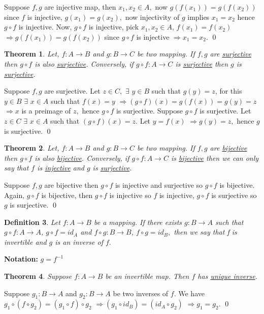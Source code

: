 \documentclass[11pt]{amsart}
\newtheorem{theorem}{Theorem}[section]
\newtheorem{definition}[theorem]{Definition}%
\begin{document}
\proof Suppose $f,g$ are injective map, then $x_{1},x_{2} \in A,$ now $g(f(x_{1}))=g(f(x_{2}))$ since $f$ is injective, $g(x_{1})=g(x_{2}),$ now injectivity of $g$ implies $x_{1}=x_{2}$ hence $g \circ f$ is injective. Now, $g\circ f$ is injective, pick $x_{1}, x_{2} \in A$, $f(x_{1})=f(x_{2})$ $\Rightarrow g(f(x_{1}))=g(f(x_{2}))$ since $g\circ f$ is injective $\Rightarrow x_{1}=x_{2}.$ \qed
\begin{theorem}
Let,  $f: A \rightarrow B$ and $g: B \rightarrow C$ be two mapping. If $f,g$ are \underline{surjective} then $g \circ f$ is also \underline{surjective}. Conversely, if $g\circ f:A \rightarrow C$ is \underline{surjective} then $g$ is \underline{surjective}.
\end{theorem}
\proof Suppose $f,g$ are surjective. Let $z \in C,$ $\exists$ $ y \in B$ such that $g(y)=z$, for this $y\in B$ $\exists$ $ x \in A$ such that $f(x)=y$ $\Rightarrow (g\circ f)(x)=g(f(x))=g(y)=z$ $\Rightarrow x$ is a preimage of $z,$ hence $g\circ f$ is surjective. Suppose $g\circ f$ is surjective. Let $z \in C$ $\exists$ $x\in A$ such that $(g\circ f)(x)=z.$ Let $y=f(x)$ $\Rightarrow g(y)=z,$ hence $g$ is surjective. \qed
\begin{theorem}
Let,  $f: A \rightarrow B$ and $g: B \rightarrow C$ be two mapping. If $f,g$ are \underline{ bijective} then $g \circ f$ is also \underline{bijective}. Conversely, if $g\circ f:A \rightarrow C$ is \underline{bijective} then we can only say that $f$ is \underline{injective} and $g$ is \underline{surjective}.
\end{theorem}
\proof Suppose $f,g$ are bijective then $g\circ f$ is injective and surjective so $g\circ f$ is bijective. Again, $g\circ f$ is bijective, then $g\circ f$ is injective so $f$ is injective, $g\circ f$ is surjective so $g$ is surjective. \qed
\begin{definition}
Let $f: A \rightarrow B$ be a mapping. If there exists $g: B \rightarrow A$ such that $g\circ f: A \rightarrow A$, $g\circ f=id_{A}$ and $f\circ g: B \rightarrow B$, $f\circ g=id_{B},$ then we say that f is invertible and $g$ is an inverse of $f.$
\end{definition}
\textbf{Notation:} $g=f^{-1}$
\begin{theorem}
Suppose $f: A \rightarrow B$ be an invertible map. Then $f$ has \underline{unique inverse}.
\end{theorem}
\proof Suppose $g_{1}:B \rightarrow A$ and $g_{2}:B \rightarrow A$ be two inverses of $f.$ We have $g_{1}\circ (f\circ g_{2})=(g_{1}\circ f)\circ g_{2}$ $\Rightarrow (g_{1}\circ id_{B})=(id_{A} \circ g_{2})$ $\Rightarrow g_{1}=g_{2}.$ \qed
\end{document}
